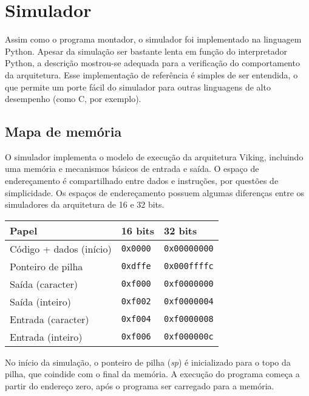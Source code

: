 \documentclass{extreport}
\begin{document}
\section{Simulador}

Assim como o programa montador, o simulador foi implementado na linguagem Python. Apesar da simulação ser bastante lenta em função do interpretador Python, a descrição mostrou-se adequada para a verificação do comportamento da arquitetura. Esse implementação de referência é simples de ser entendida, o que permite um porte fácil do simulador para outras linguagens de alto desempenho (como C, por exemplo).

\subsection{Mapa de memória}

O simulador implementa o modelo de execução da arquitetura Viking, incluindo uma memória e mecanismos básicos de entrada e saída. O espaço de endereçamento é compartilhado entre dados e instruções, por questões de simplicidade. Os espaços de endereçamento possuem algumas diferenças entre os simuladores da arquitetura de 16 e 32 bits.

\begin{table}[ht!]
\centering
\begin{tabular}{|p{5.0cm}|p{3.0cm}|p{3.0cm}|}
\hline
\bf{Papel} 		& \bf{16 bits} 		& \bf{32 bits}		\\ \hline \hline
Código + dados (início)	& \texttt{0x0000}	& \texttt{0x00000000}	\\ \hline
Ponteiro de pilha	& \texttt{0xdffe}	& \texttt{0x000ffffc}	\\ \hline
Saída (caracter)	& \texttt{0xf000}	& \texttt{0xf0000000}	\\ \hline
Saída (inteiro)		& \texttt{0xf002}	& \texttt{0xf0000004}	\\ \hline
Entrada (caracter)	& \texttt{0xf004}	& \texttt{0xf0000008}	\\ \hline
Entrada (inteiro)	& \texttt{0xf006}	& \texttt{0xf000000c}	\\ \hline
\end{tabular}
\end{table}

No início da simulação, o ponteiro de pilha (\textit{sp}) é inicializado para o topo da pilha, que coindide com o final da memória. A execução do programa começa a partir do endereço zero, após o programa ser carregado para a memória.
\end{document}
